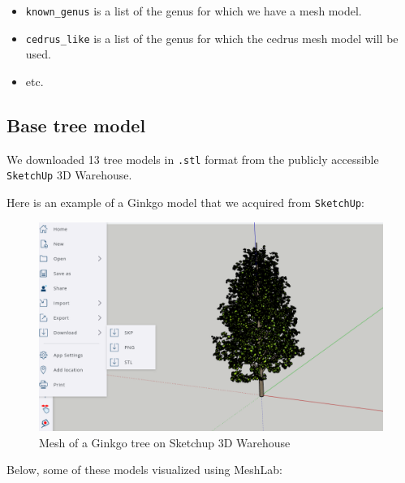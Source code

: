 \documentclass[12pt]{article}
\begin{document}
\begin{itemize}
    \item \texttt{known\_genus} is a list of the genus for which we have a mesh model.
    \item \texttt{cedrus\_like} is a list of the genus for which the cedrus mesh model will be used.
    \item etc.
\end{itemize}

\newpage

\subsection{Base tree model}
We downloaded 13 tree models in \texttt{.stl} format from the publicly
accessible \texttt{SketchUp}\cite{sketchup} 3D Warehouse.

Here is an example of a Ginkgo model that we acquired from \texttt{SketchUp}:

\begin{figure}[H]
    \centering
        \centering
        \includegraphics[width=\textwidth]{images/ginkgo_sketchup.png}
        \caption{Mesh of a Ginkgo tree on Sketchup 3D Warehouse}
\end{figure}

\newpage

Below, some of these models visualized using MeshLab\cite{meshlab}:
\end{document}
